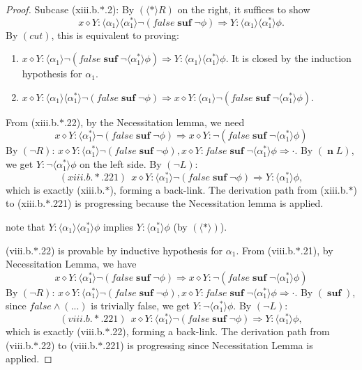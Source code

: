 \documentclass[manuscript,screen]{acmart}
\newcommand{\la}[0]{\langle}
\newcommand{\ra}[0]{\rangle}
\newcommand{\false}[0]{\mathit{false}}
\newcommand{\lup}[0]{*}
\newcommand{\cat}[0]{\diamond}
\DeclareMathOperator{\osuf}{\mathbf{suf}}
\DeclareMathOperator{\nxt}{\mathbf{n}}
\begin{document}
\begin{proof}
Subcase (xiii.b.$*$.2): 
By $(\la\lup\ra R)$ on the right, it suffices to show 
$$x\cat Y : \la\alpha_1\ra\la\alpha_1^*\ra\neg(\false\osuf\neg\phi)\Rightarrow Y : \la\alpha_1\ra\la\alpha_1^*\ra\phi.$$ 
By $(cut)$, this is equivalent to proving: 
\begin{enumerate}
\item[(xiii.b.$*$.21)] $x\cat Y : \la\alpha_1\ra\neg(\false\osuf\neg\la\alpha_1^*\ra\phi)\Rightarrow Y : \la\alpha_1\ra\la\alpha_1^*\ra\phi$. It is closed by the induction hypothesis for $\alpha_1$. 
\item[(xiii.b.$*$.22)] $x\cat Y : \la\alpha_1\ra\la\alpha_1^*\ra\neg(\false\osuf\neg\phi)\Rightarrow x\cat Y : \la\alpha_1\ra\neg(\false\osuf\neg\la\alpha_1^*\ra\phi)$.
\end{enumerate}
From (xiii.b.$*$.22), by the Necessitation lemma, we need 
$$
x\cat Y : \la\alpha_1^*\ra\neg(\false\osuf\neg\phi)\Rightarrow x\cat Y : \neg(\false\osuf\neg\la\alpha_1^*\ra\phi)
$$
By $(\neg R)$: $x\cat Y : \la\alpha_1^*\ra\neg(\false\osuf\neg\phi), x\cat Y : \false\osuf\neg\la\alpha_1^*\ra\phi\Rightarrow \cdot$. By $(\nxt L)$, we get 
$Y : \neg\la\alpha_1^*\ra\phi$ on the left side. By $(\neg L)$: 
$$(xiii.b.*.221) \ \ x\cat Y : \la\alpha_1^*\ra\neg(\false\osuf\neg\phi)\Rightarrow Y : \la\alpha_1^*\ra\phi,$$ 
which is exactly (xiii.b.$*$), forming a back-link. The derivation path from (xiii.b.$*$) to (xiii.b.$*$.221) is progressing because the Necessitation lemma is applied. 

\ifx

note that $Y : \la\alpha_1\ra\la\alpha_1^*\ra\phi$ implies $Y : \la\alpha^*_1\ra\phi$ (by $(\la *\ra)$). 

(viii.b.$*$.22) is provable by inductive hypothesis for $\alpha_1$. 
From (viii.b.$*$.21), by Necessitation Lemma, we have
$$
x\cat Y : \la\alpha_1^*\ra\neg(\false\osuf\neg\phi)\Rightarrow x\cat Y : \neg(\false\osuf\neg\la\alpha_1^*\ra\phi)
$$
By $(\neg R)$: $x\cat Y : \la\alpha_1^*\ra\neg(\false\osuf\neg\phi), x\cat Y : \false\osuf\neg\la\alpha_1^*\ra\phi\Rightarrow \cdot$. By $(\osuf)$, since $\false\wedge(...)$ is trivially false, we get 
$Y : \neg\la\alpha_1^*\ra\phi$. By $(\neg L)$: 
$$(viii.b.*.221) \ \ x\cat Y : \la\alpha_1^*\ra\neg(\false\osuf\neg\phi)\Rightarrow Y : \la\alpha_1^*\ra\phi,$$ 
which is exactly (viii.b.$*$.22), forming a back-link. The derivation path from (viii.b.$*$.22) to (viii.b.$*$.221) is progressing since Necessitation Lemma is applied.
\fi
\end{proof}
\end{document}
